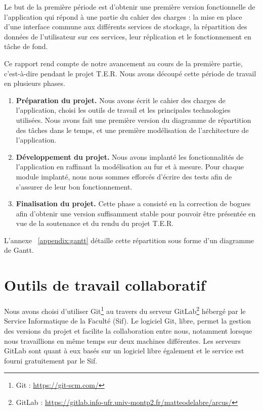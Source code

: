 \clearpage

Le but de la première période est d'obtenir une première version fonctionnelle de l'application qui répond à une partie du cahier des charges : la mise en place d'une interface commune aux différents services de stockage, la répartition des données de l'utilisateur sur ces services, leur réplication et le fonctionnement en tâche de fond.

Ce rapport rend compte de notre avancement au cours de la première partie, c'est-à-dire pendant le projet T.E.R. Nous avons découpé cette période de travail en plusieurs phases.

\begin{enumerate}[label=\textbf{\arabic*.}]
    \item \textbf{Préparation du projet.} Nous avons écrit le cahier des charges de l'application, choisi les outils de travail et les principales technologies utilisées. Nous avons fait une première version du diagramme de répartition des tâches dans le temps, et une première modélisation de l'architecture de l'application.
    \item \textbf{Développement du projet.} Nous avons implanté les fonctionnalités de l'application en raffinant la modélisation au fur et à mesure. Pour chaque module implanté, nous nous sommes efforcés d'écrire des tests afin de s'assurer de leur bon fonctionnement.
    \item \textbf{Finalisation du projet.} Cette phase a consisté en la correction de bogues afin d'obtenir une version suffisamment stable pour pouvoir être présentée en vue de la soutenance et du rendu du projet T.E.R.
\end{enumerate}

L'annexe ~\ref{appendix:gantt} détaille cette répartition sous forme d'un diagramme de Gantt.

\section{Outils de travail collaboratif}

Nous avons choisi d'utiliser Git\footnote{Git : \url{https://git-scm.com/}} au travers du serveur GitLab\footnote{GitLab : \url{https://gitlab.info-ufr.univ-montp2.fr/matteodelabre/arcus/}} hébergé par le Service Informatique de la Faculté (Sif). Le logiciel Git, libre, permet la gestion des versions du projet et facilite la collaboration entre nous, notamment lorsque nous travaillions en même temps sur deux machines différentes. Les serveurs GitLab sont quant à eux basés sur un logiciel libre également et le service est fourni gratuitement par le Sif.

